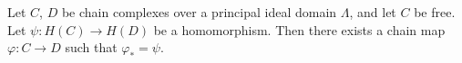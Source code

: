 Let $C$, $D$ be chain complexes over a principal ideal domain $\Lambda$, and let $C$ be free. Let $\psi : H(C) \rightarrow H(D)$ be a homomorphism. Then there exists a chain map $\varphi : C \rightarrow D$ such that $\varphi_* = \psi$.
